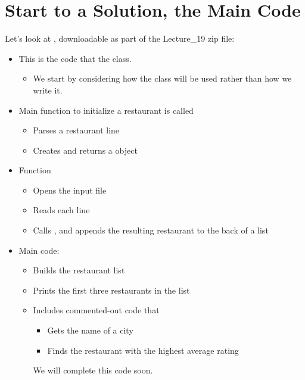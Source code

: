 \documentclass[letterpaper,10pt,english]{sphinxmanual}
\begin{document}
\section{Start to a Solution, the Main Code}
\label{\detokenize{lecture_notes/lec19_classes2:start-to-a-solution-the-main-code}}
Let’s look at , downloadable as part
of the Lecture\_19 zip file:
\begin{itemize}
\item {} 
This is the code that  the  class.
\begin{itemize}
\item {} 
We start by considering how the class will be used rather than
how we write it.

\end{itemize}

\item {} 
Main function to initialize a restaurant is called
\begin{itemize}
\item {} 
Parses a restaurant line

\item {} 
Creates and returns a  object

\end{itemize}

\item {} 
Function 
\begin{itemize}
\item {} 
Opens the input file

\item {} 
Reads each line

\item {} 
Calls , and appends the resulting
restaurant to the back of a list

\end{itemize}

\item {} 
Main code:
\begin{itemize}
\item {} 
Builds the restaurant list

\item {} 
Prints the first three restaurants in the list

\item {} 
Includes commented-out code that
\begin{itemize}
\item {} 
Gets the name of a city

\item {} 
Finds the restaurant with the highest average rating

\end{itemize}

We will complete this code soon.

\end{itemize}

\end{itemize}
\end{document}
